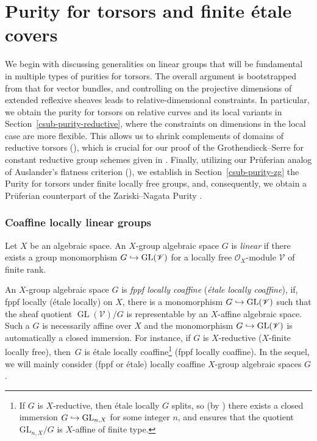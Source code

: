 \documentclass[JEP,XML,SOM,Unicode,published]{cedram}
\newcommand\hto{\mathrel{\lhook\joinrel\to}}
\newcommand{\sO}{\mathscr{O}}
\newcommand{\sV}{\mathscr{V}}
\let\hra\hto
\DeclareMathOperator{\GL}{GL}
\theoremstyle{plain}
\theoremstyle{definition}
\begin{document}
\section{Purity for torsors and finite étale covers}
We begin with discussing generalities on linear groups that will be fundamental in multiple types of purities for torsors. The overall argument is bootstrapped from that for vector bundles, and controlling on the projective dimensions of extended reflexive sheaves leads to relative-dimensional constraints.
In particular, we obtain the purity for torsors on relative curves and its local variants in Section~\ref{csub-purity-reductive}, where the constraints on dimensions in the local case are more flexible.
This allows us to shrink complements of domains of reductive torsors (\cf \cite[Prop.\,2.9 \& Cor.\,2.10]{GL23}), which is crucial for our proof of the Grothendieck--Serre for constant reductive group schemes given in \cite{GL23}.
Finally, utilizing our Prüferian analog of Auslander's flatness criterion (\cf {}), we establish in Section~\ref{csub-purity-zg} the Purity  for torsors under finite locally free groups, and, consequently, we obtain a Prüferian counterpart of the Zariski--Nagata Purity .

\subsubsection{Coaffine locally linear groups}\label{linear-coaffine}
Let $X$ be an algebraic space. An $X$-group algebraic space $G$ is \emph{linear} if there exists a group monomorphism $G\hra \GL(\sV)$ for a locally free $\sO_X$\nobreakdash-mod\-ule $\sV$ of finite rank.

An $X$-group algebraic space $G$ is \emph{fppf locally coaffine} (\resp \emph{étale locally coaffine}), if, fppf locally (\resp étale locally) on $X$, there is a monomorphism $G\hra \GL(\sV)$ such that the sheaf quotient $\GL(\sV)/G$ is representable by an $X$-affine algebraic space. Such a $G$ is necessarily affine over $X$ {and the monomorphism $G\hra \GL(\sV)$ is automatically a closed immersion}.
For instance, if $G$ is $X$-reductive (\resp $X$-finite locally free), then~$G$ is étale locally coaffine\footnote{If $G$ is $X$-reductive, then étale locally $G$ splits, so (by \eg \cite[Th.\,1.1 \& Cor.\,4.3]{Gil21}) there exists a closed immersion $G\hra \mathrm{GL}_{n,X}$ for some integer $n$, and \cite[9.4.1]{Alp14} ensures that the quotient $\mathrm{GL}_{n,X}/G$ is $X$-affine of finite type.} (\resp fppf locally coaffine).
In the sequel, we will mainly consider (fppf or étale) locally coaffine $X$-group algebraic spaces $G$.
\end{document}
